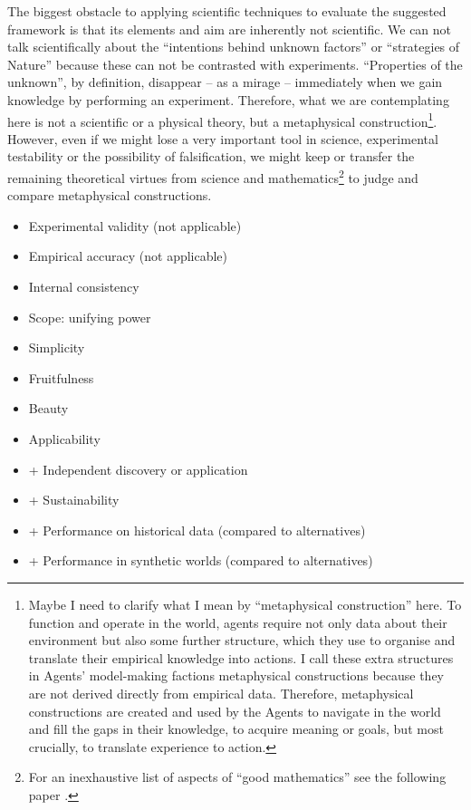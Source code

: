 \documentclass{article}
\begin{document}
The biggest obstacle to applying scientific techniques to evaluate the suggested framework is that its elements and aim are inherently not scientific.
We can not talk scientifically about the ``intentions behind unknown factors'' or ``strategies of Nature'' because these can not be contrasted with experiments.
``Properties of the unknown'', by definition, disappear -- as a mirage -- immediately when we gain knowledge by performing an experiment.
Therefore, what we are contemplating here is not a scientific or a physical theory, but a metaphysical construction\footnote{Maybe I need to clarify what I mean by ``metaphysical construction'' here. To function and operate in the world, agents require not only data about their environment but also some further structure, which they use to organise and translate their empirical knowledge into actions. I call these extra structures in Agents' model-making factions metaphysical constructions because they are not derived directly from empirical data. Therefore, metaphysical constructions are created and used by the Agents to navigate in the world and fill the gaps in their knowledge, to acquire meaning or goals, but most crucially, to translate experience to action.}.
However, even if we might lose a very important tool in science, experimental testability or the possibility of falsification, we might keep or transfer the remaining theoretical virtues from science and mathematics\footnote{For an inexhaustive list of aspects of ``good mathematics'' see the following paper \cite{arxiv:GoodMathematics}.} to judge and compare metaphysical constructions.

\begin{itemize}
    \item Experimental validity (not applicable)
    \item Empirical accuracy (not applicable)
    \item Internal consistency
    \item Scope: unifying power
    \item Simplicity
    \item Fruitfulness
    \item Beauty
    \item Applicability
    \item + Independent discovery or application
    \item + Sustainability
    \item + Performance on historical data (compared to alternatives)
    \item + Performance in synthetic worlds (compared to alternatives)
\end{itemize}
\end{document}
